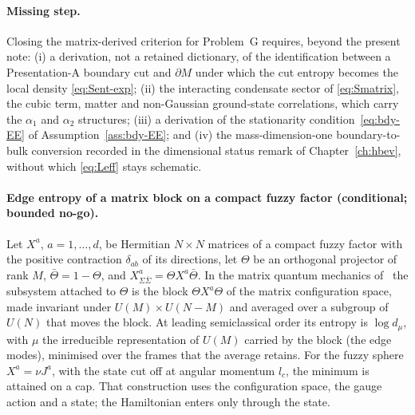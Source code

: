 \paragraph{Missing step.}
Closing the matrix-derived criterion for Problem~G requires, beyond the
present note: (i) a derivation, not a retained dictionary, of the
identification between a Presentation-A boundary cut and \(\partial M\) under
which the cut entropy becomes the local density \eqref{eq:Sent-exp}; (ii) the
interacting condensate sector of \eqref{eq:Smatrix}, the cubic term, matter
and non-Gaussian ground-state correlations, which carry the \(\alpha_1\) and
\(\alpha_2\) structures; (iii) a derivation of the stationarity
condition~\eqref{eq:bdy-EE} of Assumption~\ref{ass:bdy-EE}; and (iv) the
mass-dimension-one boundary-to-bulk conversion recorded in the dimensional
status remark of Chapter~\ref{ch:hbev}, without which \eqref{eq:Leff} stays
schematic.

\paragraph{Edge entropy of a matrix block on a compact fuzzy factor (conditional; bounded no-go).}
Let \(X^a\), \(a=1,\dots,d\), be Hermitian \(N\times N\) matrices of a compact fuzzy factor with the positive contraction \(\delta_{ab}\) of its directions, let \(\Theta\) be an orthogonal projector of rank \(M\), \(\bar\Theta=1-\Theta\), and \(X^a_{\Sigma\bar\Sigma}=\Theta X^a\bar\Theta\). In the matrix quantum mechanics of~\cite{FlissFrenkelHartnollSoni2025} the subsystem attached to \(\Theta\) is the block \(\Theta X^a\Theta\) of the matrix configuration space, made invariant under \(U(M)\times U(N-M)\) and averaged over a subgroup of \(U(N)\) that moves the block. At leading semiclassical order its entropy is \(\log d_\mu\), with \(\mu\) the irreducible representation of \(U(M)\) carried by the block (the edge modes), minimised over the frames that the average retains. For the fuzzy sphere \(X^a=\nu J^a\), with the state cut off at angular momentum \(l_c\), the minimum is attained on a cap. That construction uses the configuration space, the gauge action and a state; the Hamiltonian enters only through the state.

